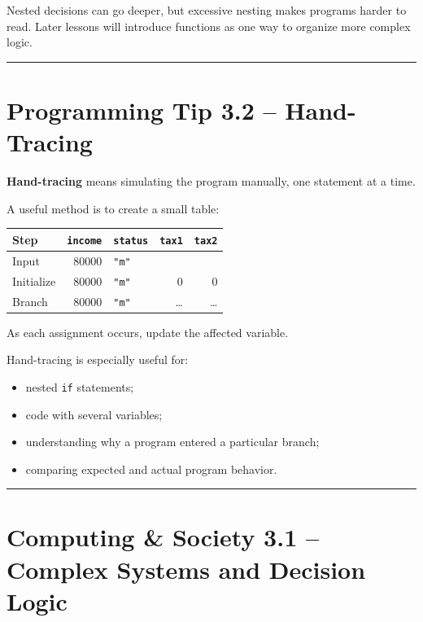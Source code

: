 \documentclass[
  11pt,
  a4paper,
]{article}
\providecommand{\tightlist}{%
  \setlength{\itemsep}{0pt}\setlength{\parskip}{0pt}}
\begin{document}
Nested decisions can go deeper, but excessive nesting makes programs
harder to read. Later lessons will introduce functions as one way to
organize more complex logic.

\begin{center}\rule{0.5\linewidth}{0.5pt}\end{center}

\section{Programming Tip 3.2 --
Hand-Tracing}\label{programming-tip-3.2-hand-tracing}

\textbf{Hand-tracing} means simulating the program manually, one
statement at a time.

A useful method is to create a small table:

\begin{longtable}[]{@{}lrlrr@{}}
\toprule\noalign{}
Step & \texttt{income} & \texttt{status} & \texttt{tax1} &
\texttt{tax2} \\
\midrule\noalign{}
\endhead
\bottomrule\noalign{}
\endlastfoot
Input & 80000 & \texttt{"m"} & & \\
Initialize & 80000 & \texttt{"m"} & 0 & 0 \\
Branch & 80000 & \texttt{"m"} & \ldots{} & \ldots{} \\
\end{longtable}

As each assignment occurs, update the affected variable.

Hand-tracing is especially useful for:

\begin{itemize}
\tightlist
\item
  nested \texttt{if} statements;
\item
  code with several variables;
\item
  understanding why a program entered a particular branch;
\item
  comparing expected and actual program behavior.
\end{itemize}

\begin{center}\rule{0.5\linewidth}{0.5pt}\end{center}

\section{Computing \& Society 3.1 -- Complex Systems and Decision
Logic}\label{computing-society-3.1-complex-systems-and-decision-logic}
\end{document}
